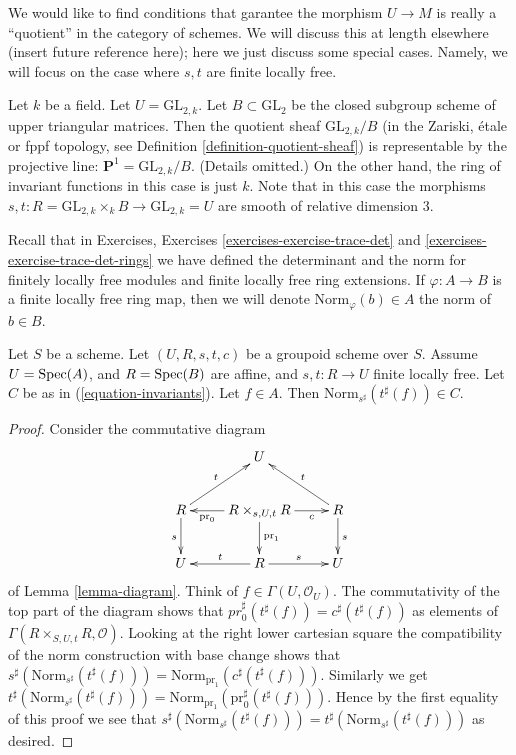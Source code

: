 \medskip\noindent
We would like to find conditions that garantee the morphism $U \to M$ is
really a ``quotient'' in the category of schemes. We will discuss this at
length elsewhere (insert future reference here); here we just discuss some
special cases. Namely, we will focus on the case where $s, t$ are finite
locally free.

\begin{example}
\label{example-quotient-projective-line}
Let $k$ be a field. Let $U = \text{GL}_{2, k}$. Let $B \subset \text{GL}_2$
be the closed subgroup scheme of upper triangular matrices.
Then the quotient sheaf $\text{GL}_{2, k}/B$ (in the Zariski, \'etale or
fppf topology, see Definition \ref{definition-quotient-sheaf}) is
representable by the projective line: $\mathbf{P}^1 = \text{GL}_{2, k}/B$.
(Details omitted.)
On the other hand, the ring of invariant functions in this case is just $k$.
Note that in this case the morphisms
$s, t : R = \text{GL}_{2, k} \times_k B \to \text{GL}_{2, k} = U$ are smooth
of relative dimension $3$.
\end{example}

\noindent
Recall that in
Exercises, Exercises
\ref{exercises-exercise-trace-det} and
\ref{exercises-exercise-trace-det-rings}
we have defined the determinant
and the norm for finitely locally free modules and finite locally free ring
extensions. If $\varphi : A \to B$ is a finite locally free ring map, then
we will denote $\text{Norm}_\varphi(b) \in A$ the norm of $b \in B$.

\begin{lemma}
\label{lemma-determinant-trick}
Let $S$ be a scheme. Let $(U, R, s, t, c)$ be a groupoid scheme over $S$.
Assume $U = \mathop{\rm Spec}(A)$, and $R = \mathop{\rm Spec}(B)$ are affine, and
$s, t : R \to U$ finite locally free.
Let $C$ be as in (\ref{equation-invariants}).
Let $f \in A$. Then $\text{Norm}_{s^\sharp}(t^\sharp(f)) \in C$.
\end{lemma}

\begin{proof}
Consider the commutative diagram
$$
\xymatrix{
& U & \\
R \ar[d]_s \ar[ru]^t &
R \times_{s, U, t} R
\ar[l]^-{\text{pr}_0} \ar[d]^{\text{pr}_1} \ar[r]_-c &
R \ar[d]^s \ar[lu]_t \\
U & R \ar[l]_t \ar[r]^s & U
}
$$
of Lemma \ref{lemma-diagram}.
Think of $f \in \Gamma(U, \mathcal{O}_U)$. The commutativity of the
top part of the diagram shows that
$pr_0^\sharp(t^\sharp(f)) = c^\sharp(t^\sharp(f))$ as elements of
$\Gamma(R \times_{S, U, t} R, \mathcal{O})$.
Looking at the right lower cartesian square
the compatibility of the norm construction with base change shows that
$s^\sharp(\text{Norm}_{s^\sharp}(t^\sharp(f))) =
\text{Norm}_{\text{pr}_1}(c^\sharp(t^\sharp(f)))$.
Similarly we get
$t^\sharp(\text{Norm}_{s^\sharp}(t^\sharp(f))) =
\text{Norm}_{\text{pr}_1}(\text{pr}_0^\sharp(t^\sharp(f)))$.
Hence by the first equality of this proof we see that
$s^\sharp(\text{Norm}_{s^\sharp}(t^\sharp(f))) =
t^\sharp(\text{Norm}_{s^\sharp}(t^\sharp(f)))$ as desired.
\end{proof}

